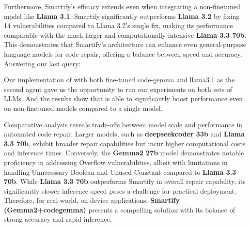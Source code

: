 Furthermore, Smartify's efficacy extends even when integrating a non-finetuned model like \textbf{Llama 3.1}. Smartify significantly outperforms \textbf{Llama 3.2} by fixing 14 vulnerabilities compared to Llama 3.2's single fix, making its performance comparable with the much larger and computationally intensive \textbf{Llama 3.3 70b}. This demonstrates that Smartify's architecture can enhance even general-purpose language models for code repair, offering a balance between speed and accuracy. Answering our last query:

\begin{tcolorbox}[
  colback=green!15, %
  colframe=green!40, %
  title=RQ4 - Generalization,
  fonttitle=\bfseries,
    coltitle=black, %
  boxrule=0.75mm, %
  rounded corners, %
  left=1mm, %
  right=1mm, %
  top=1mm, %
  bottom=1mm %
]
Our implementation of \sln{} with both fine-tuned code-gemma and llama3.1 as the second agent gave us the opportunity to run our experiments on both sets of LLMs. And the results show that \sln{} is able to significantly boost performance even on non-finetuned models compared to a single model.
\end{tcolorbox}

Comparative analysis reveals trade-offs between model scale and performance in automated code repair. Larger models, such as \textbf{deepseekcoder 33b} and \textbf{Llama 3.3 70b}, exhibit broader repair capabilities but incur higher computational costs and inference times. Conversely, the \textbf{Gemma2 27b} model demonstrates notable proficiency in addressing Overflow vulnerabilities, albeit with limitations in handling Unnecessary Boolean and Unused Constant compared to \textbf{Llama 3.3 70b}. While \textbf{Llama 3.3 70b} outperforms Smartify in overall repair capability, its significantly slower inference speed poses a challenge for practical deployment. Therefore, for real-world, on-device applications, \textbf{Smartify (Gemma2+codegemma)} presents a compelling solution with its balance of strong accuracy and rapid inference.

\begin{center}
\end{center}

